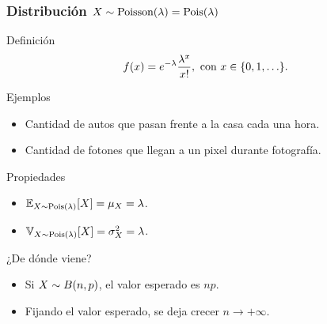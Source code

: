 \documentclass[table]{beamer}
\begin{document}
\begin{frame}
    \frametitle{Distribución $X \sim \text{Poisson} \parens{\lambda} = \poisson{\lambda}$}
    \begin{block}{Definición}
            \begin{equation*}
                \ff{x} = e^{- \lambda} \frac{\lambda^{x}}{x!} , \text{ con } x \in \bparens{0, 1, \ldots} .
            \end{equation*}
    \end{block}
    \begin{exampleblock}{Ejemplos}
        \begin{itemize}
            \item Cantidad de autos que pasan frente a la casa cada una hora.
            \item Cantidad de fotones que llegan a un pixel durante fotografía.
        \end{itemize}
    \end{exampleblock}
    \begin{block}{Propiedades}
        \begin{itemize}
            \item $\expecteddist{X \sim \poisson{\lambda}}{X} = \mu_{X} = \lambda$.
            \item $\variancedist{X \sim \poisson{\lambda}}{X} = \sigma^{2}_{X} = \lambda$.
        \end{itemize}
    \end{block}
    \begin{block}{¿De dónde viene?}
        \begin{itemize}
            \item Si $X \sim \binomial{n}{p}$, el valor esperado es $n p$.
            \item Fijando el valor esperado, se deja crecer $n \rightarrow + \infty$.
        \end{itemize}
    \end{block}
\end{frame}
\end{document}
